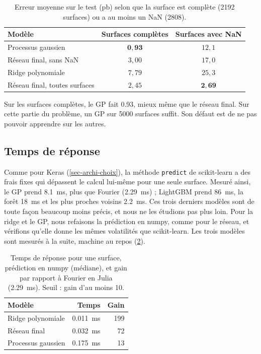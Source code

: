 \begin{table}[H]
  \centering
  \caption{Erreur moyenne sur le test (pb) selon que la surface est complète (\num{2192} surfaces) ou a au moins
  un NaN (\num{2808}).}
  \label{tab-ml-nan}
  \small
  \begin{tabular}{lcc}
    \toprule
    Modèle & Surfaces complètes & Surfaces avec NaN \\
    \midrule
    Processus gaussien                         & $\mathbf{0{,}93}$ & $12{,}1$ \\
    Réseau final, sans NaN                     & $3{,}00$ & $17{,}0$ \\
    Ridge polynomiale                          & $7{,}79$ & $25{,}3$ \\
    Réseau final, toutes surfaces              & $2{,}45$ & $\mathbf{2{,}69}$ \\
    \bottomrule
  \end{tabular}
\end{table}

Sur les surfaces complètes, le GP fait \num{0.93}\pb, mieux même que le réseau final. Sur cette partie du
problème, un GP sur \num{5000} surfaces suffit. Son défaut est de ne pas pouvoir apprendre sur les autres.

\subsection{Temps de réponse}
\label{sec-ml-temps}

Comme pour Keras (\cref{sec-archi-choix}), la méthode \texttt{predict} de scikit-learn a des frais fixes qui
dépassent le calcul lui-même pour une seule surface. Mesuré ainsi, le GP prend \SI{8.1}{\ms}, plus que Fourier
(\SI{2.29}{\ms}) ; LightGBM prend \SI{86}{\ms}, la forêt \SI{18}{\ms} et les plus proches voisins \SI{2.2}{\ms}. Ces
trois derniers modèles sont de toute façon beaucoup moins précis, et nous ne les étudions pas plus loin. Pour la
ridge et le GP, nous refaisons la prédiction en numpy, comme pour le réseau, et vérifions qu'elle donne les mêmes
volatilités que scikit-learn. Les trois modèles sont mesurés à la suite, machine au repos
(\cref{tab-ml-temps}).

\begin{table}[H]
  \centering
  \caption{Temps de réponse pour une surface, prédiction en numpy (médiane), et gain par rapport à Fourier en
  Julia (\SI{2.29}{\ms}). Seuil : gain d'au moins 10.}
  \label{tab-ml-temps}
  \begin{tabular}{lrr}
    \toprule
    Modèle & Temps & Gain \\
    \midrule
    Ridge polynomiale  & \SI{0.011}{\ms} & \num{199} \\
    Réseau final       & \SI{0.032}{\ms} & \num{72} \\
    Processus gaussien & \SI{0.175}{\ms} & \num{13} \\
    \bottomrule
  \end{tabular}
\end{table}

